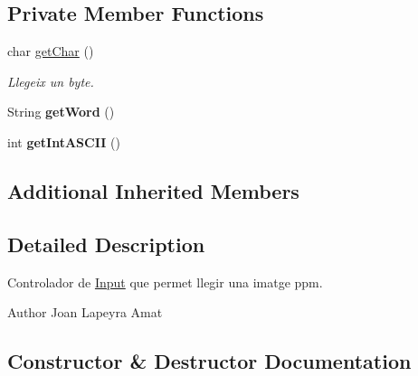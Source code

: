 \subsection*{Private Member Functions}
\begin{DoxyCompactItemize}
\item 
char \hyperlink{classpersistencia_1_1input_1_1Ctrl__Input__Img_a3a1584d1b3a8939a809035356598688c}{get\+Char} ()
\begin{DoxyCompactList}\small\item\em Llegeix un byte. \end{DoxyCompactList}\item 
\mbox{\label{classpersistencia_1_1input_1_1Ctrl__Input__Img_a4219a110d7d84e7b883ffd88e18a0def}} 
String {\bfseries get\+Word} ()
\item 
\mbox{\label{classpersistencia_1_1input_1_1Ctrl__Input__Img_a430158ff229038ddc3476d406239f4cd}} 
int {\bfseries get\+Int\+A\+S\+C\+II} ()
\end{DoxyCompactItemize}
\subsection*{Additional Inherited Members}


\subsection{Detailed Description}
Controlador de \hyperlink{classpersistencia_1_1input_1_1Input}{Input} que permet llegir una imatge ppm. 

\begin{DoxyAuthor}{Author}
Joan Lapeyra Amat 
\end{DoxyAuthor}


\subsection{Constructor \& Destructor Documentation}
\mbox{\label{classpersistencia_1_1input_1_1Ctrl__Input__Img_a79318a62df31dfd107554e92e29f6d9a}} 
